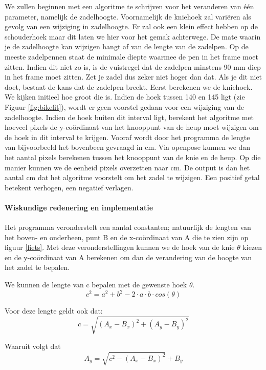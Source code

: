 \documentclass[a4paper,twoside,kulak]{kulakreport}
\begin{document}
We zullen beginnen met een algoritme te schrijven voor het veranderen van één parameter, namelijk de zadelhoogte. Voornamelijk de kniehoek zal variëren als gevolg van een wijziging in zadelhoogte. Er zal ook een klein effect hebben op de schouderhoek maar dit laten we hier voor het gemak achterwege. De mate waarin je de zadelhoogte kan wijzigen hangt af van de lengte van de zadelpen. Op de meeste zadelpennen staat de minimale diepte waarmee de pen in het frame moet zitten. Indien dit niet zo is, is de vuistregel dat de zadelpen minstens 90 \si{mm} diep in het frame moet zitten. Zet je zadel dus zeker niet hoger dan dat. Als je dit niet doet, bestaat de kans dat de zadelpen breekt.
Eerst berekenen we de kniehoek. We kijken initieel hoe groot die is. Indien de hoek tussen 140 \degree en 145 \degree ligt (zie Figuur \ref{fig:bikefit}), wordt er geen voorstel gedaan voor een wijziging van de zadelhoogte. Indien de hoek buiten dit interval ligt, berekent het algoritme met hoeveel pixels de y-coördinaat van het knooppunt van de heup moet wijzigen om de hoek in dit interval te krijgen. Vooraf wordt door het programma de lengte van bijvoorbeeld het bovenbeen gevraagd in \si{cm}. Via openpose kunnen we dan het aantal pixels berekenen tussen het knooppunt van de knie en de heup. Op die manier kunnen we de eenheid pixels overzetten naar \si{cm}. De output is dan het aantal \si{cm} dat het algoritme voorstelt om het zadel te wijzigen. Een positief getal betekent verhogen, een negatief verlagen.

\paragraph{Wiskundige redenering en implementatie}
Het programma veronderstelt een aantal constanten; natuurlijk de lengten van het boven- en onderbeen, punt B en de x-coördinaat van A die te zien zijn op figuur \ref{fiets}. Met deze veronderstellingen kunnen we de hoek van de knie $\theta$ kiezen en de y-coördinaat van A berekenen om dan de verandering van de hoogte van het zadel te bepalen.

We kunnen de lengte van c bepalen met de gewenste hoek $\theta$.
\[c^2 = a^2 + b^2 -2\cdot a \cdot b \cdot cos(\theta)\]

Voor deze lengte geldt ook dat:
\[c = \sqrt{(A_x - B_x)^2 + (A_y - B_y)^2}\]

Waaruit volgt dat
\[A_y = \sqrt{c^2 - (A_x - B_x)^2} + B_y\]
\end{document}
